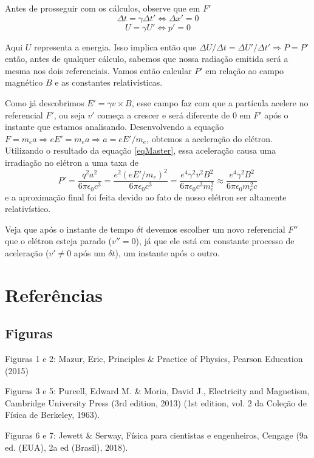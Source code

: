 \documentclass[12pt, letterpaper]{article}
\begin{document}
    Antes de prosseguir com os cálculos, observe que em $F'$
    $$
    \Delta t = \gamma\Delta t' \iff \Delta x' = 0
    $$$$
    U = \gamma U' \iff p' = 0
    $$

    Aqui $U$ representa a energia. Isso implica então que $\Delta U/\Delta t = \Delta U'/\Delta t' \Longrightarrow P = P'$ então, antes de qualquer cálculo, sabemos que nossa radiação emitida será a mesma nos dois referenciais. Vamos então calcular $P'$ em relação ao campo magnético $B$ e as constantes relativísticas.

    Como já descobrimos $E' = \gamma v\times B$, esse campo faz com que a partícula acelere no referencial $F'$, ou seja $v'$ começa a crescer e será diferente de 0 em $F'$ após o instante que estamos analisando. Desenvolvendo a equação $F = m_ea \Rightarrow eE' = m_ea \Rightarrow a = eE'/m_e$, obtemos a aceleração do elétron. Utilizando o resultado da equação \ref{eqMaster}, essa aceleração causa uma irradiação no elétron a uma taxa de
    \begin{equation} \label{eq13}
        P' = \frac{q^2a^2}{6\pi\epsilon_0c^3} = \frac{e^2(eE'/m_e)^2}{6\pi\epsilon_0c^3} = \frac{e^4\gamma^2v^2B^2}{6\pi\epsilon_0c^3m_e^2} \approx \frac{e^4\gamma^2B^2}{6\pi\epsilon_0m_e^2c}
    \end{equation}
    e a aproximação final foi feita devido ao fato de nosso elétron ser altamente relativístico.

    Veja que após o instante de tempo $\delta t$ devemos escolher um novo referencial $F''$ que o elétron esteja parado ($v'' = 0$), já que ele está em constante processo de aceleração ($v' \neq 0$ após um $\delta t$), um instante após o outro.

\newpage
\section{Referências}
    \subsection{Figuras}
    Figuras 1 e 2: Mazur, Eric, Principles \& Practice of Physics, Pearson Education (2015)

    Figuras 3 e 5: Purcell, Edward M. \& Morin, David J., Electricity and Magnetism, Cambridge University Press (3rd edition, 2013) (1st edition, vol. 2 da Coleção de Física de Berkeley, 1963).

    Figuras 6 e 7: Jewett \& Serway, Física para cientistas e engenheiros, Cengage (9a ed. (EUA), 2a ed (Brasil), 2018).
\end{document}
